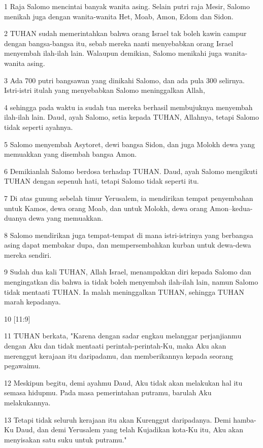 \par 1 Raja Salomo mencintai banyak wanita asing. Selain putri raja Mesir, Salomo menikah juga dengan wanita-wanita Het, Moab, Amon, Edom dan Sidon.
\par 2 TUHAN sudah memerintahkan bahwa orang Israel tak boleh kawin campur dengan bangsa-bangsa itu, sebab mereka nanti menyebabkan orang Israel menyembah ilah-ilah lain. Walaupun demikian, Salomo menikahi juga wanita-wanita asing.
\par 3 Ada 700 putri bangsawan yang dinikahi Salomo, dan ada pula 300 selirnya. Istri-istri itulah yang menyebabkan Salomo meninggalkan Allah,
\par 4 sehingga pada waktu ia sudah tua mereka berhasil membujuknya menyembah ilah-ilah lain. Daud, ayah Salomo, setia kepada TUHAN, Allahnya, tetapi Salomo tidak seperti ayahnya.
\par 5 Salomo menyembah Asytoret, dewi bangsa Sidon, dan juga Molokh dewa yang memuakkan yang disembah bangsa Amon.
\par 6 Demikianlah Salomo berdosa terhadap TUHAN. Daud, ayah Salomo mengikuti TUHAN dengan sepenuh hati, tetapi Salomo tidak seperti itu.
\par 7 Di atas gunung sebelah timur Yerusalem, ia mendirikan tempat penyembahan untuk Kamos, dewa orang Moab, dan untuk Molokh, dewa orang Amon--kedua-duanya dewa yang memuakkan.
\par 8 Salomo mendirikan juga tempat-tempat di mana istri-istrinya yang berbangsa asing dapat membakar dupa, dan mempersembahkan kurban untuk dewa-dewa mereka sendiri.
\par 9 Sudah dua kali TUHAN, Allah Israel, menampakkan diri kepada Salomo dan mengingatkan dia bahwa ia tidak boleh menyembah ilah-ilah lain, namun Salomo tidak mentaati TUHAN. Ia malah meninggalkan TUHAN, sehingga TUHAN marah kepadanya.
\par 10 [11:9]
\par 11 TUHAN berkata, "Karena dengan sadar engkau melanggar perjanjianmu dengan Aku dan tidak mentaati perintah-perintah-Ku, maka Aku akan merenggut kerajaan itu daripadamu, dan memberikannya kepada seorang pegawaimu.
\par 12 Meskipun begitu, demi ayahmu Daud, Aku tidak akan melakukan hal itu semasa hidupmu. Pada masa pemerintahan putramu, barulah Aku melakukannya.
\par 13 Tetapi tidak seluruh kerajaan itu akan Kurenggut daripadanya. Demi hamba-Ku Daud, dan demi Yerusalem yang telah Kujadikan kota-Ku itu, Aku akan menyisakan satu suku untuk putramu."
